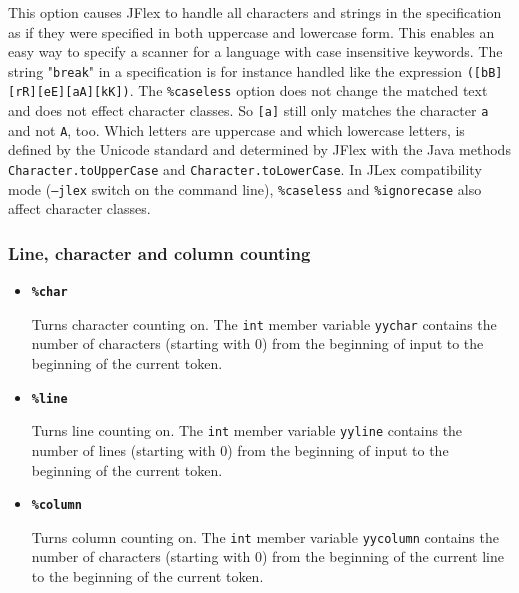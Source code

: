 \documentclass[11pt]{scrartcl}
\begin{document}
\begin{itemize}
This option causes JFlex to handle all characters and strings in the
specification as if they were specified in both uppercase and lowercase form.
This enables an easy way to specify a scanner for a language with case
insensitive keywords. The string "\texttt{break}" in a specification is for
instance handled like the expression \texttt{([bB][rR][eE][aA][kK])}. The
\texttt{\%caseless} option does not change the matched text and does not
effect character classes. So \texttt{[a]} still only matches the character
\texttt{a} and not \texttt{A}, too. Which letters are uppercase and which
lowercase letters, is defined by the Unicode standard and determined by JFlex
with the Java methods \texttt{Character.toUpperCase} and
\texttt{Character.toLowerCase}. In JLex compatibility mode (\texttt{--jlex}
switch on the command line), \texttt{\%caseless} and \texttt{\%ignorecase}
also affect character classes.

 \end{itemize}
\subsubsection{Line, character and column counting\label{Counting}}
\begin{itemize}
\item
{\bf \texttt{\%char}}

Turns character counting on. The \texttt{int} member variable \texttt{yychar}
contains the number of characters (starting with 0) from the beginning
of input to the beginning of the current token.
 
\item
{\bf \texttt{\%line}}

Turns line counting on. The \texttt{int} member variable \texttt{yyline}
contains the number of lines (starting with 0) from the beginning of input
to the beginning of the current token.
 
\item
{\bf \texttt{\%column}}

Turns column counting on. The \texttt{int} member variable \texttt{yycolumn}
contains the number of characters (starting with 0) from the beginning
of the current line to the beginning of the current token.

 \end{itemize}
\end{document}
